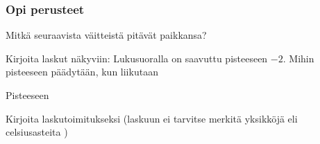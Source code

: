 \begin{tehtavasivu}

\subsubsection*{Opi perusteet}

\begin{tehtava}
   	Mitkä seuraavista väitteistä pitävät paikkansa?
    \begin{alakohdat}
        \alakohta{$-1 \notin \zz$}
        \alakohta{$-1 \in \nn$}
    \end{alakohdat}
    \begin{vastaus}
    	\begin{alakohdat}
        \end{alakohdat}
    \end{vastaus}
\end{tehtava}


\begin{tehtava}
   	Kirjoita laskut näkyviin: Lukusuoralla on saavuttu pisteeseen $-2$. Mihin pisteeseen päädytään, kun liikutaan
    \begin{alakohdat}
    \end{alakohdat}

    \begin{vastaus}
    	Pisteeseen 
        \begin{alakohdat}
        \end{alakohdat}
    \end{vastaus}
\end{tehtava}


\begin{tehtava}
    Kirjoita laskutoimitukseksi (laskuun ei tarvitse merkitä yksikköjä eli celsiusasteita %
    )


\end{tehtava}
\end{tehtavasivu}

